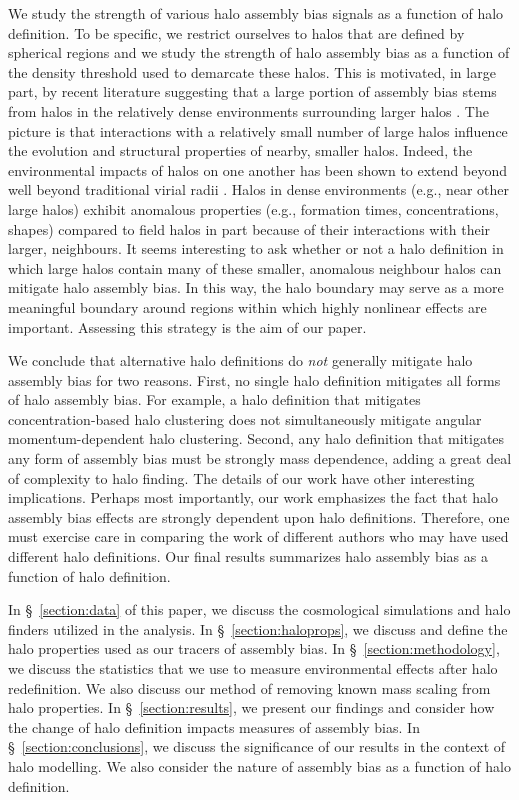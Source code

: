 \documentclass[usenatbib,fleqn]{mnras}
\begin{document}
We study the strength of various halo assembly bias signals as a function of halo definition. To be specific, we restrict ourselves to halos that are defined by spherical regions and we study the strength of halo assembly bias as a function of the density threshold used to demarcate these halos. This is motivated, in large part, by recent literature suggesting that a large portion of assembly bias stems from halos in the relatively dense environments surrounding larger halos \citep{wang_etal07,warnick_etal08,more_etal15,sunayama_etal16}. The picture is that interactions with a relatively small number of large halos influence the evolution and structural properties of nearby, smaller halos. Indeed, the environmental impacts of halos on one another has been shown to extend beyond well beyond traditional 
virial radii \citep{wetzel_etal14,diemer_kravtsov14,behroozi_etal13b,adhikari_etal14,wetzel_nagai15,more_etal15}. Halos in dense environments (e.g., near other large halos) exhibit anomalous properties (e.g., formation times, concentrations, shapes) compared to field halos in part because of their interactions with their larger, neighbours. It seems interesting to ask whether or not a halo definition in which large halos contain many of these smaller, anomalous neighbour halos can mitigate halo assembly bias. In this way, the halo boundary may serve as a more meaningful boundary around regions within which highly nonlinear effects are important. Assessing this strategy is the aim of our paper. 

We conclude that alternative halo definitions do {\em not} generally mitigate halo assembly bias for two reasons. First, no single halo definition mitigates all forms of halo assembly bias. For example, a halo definition that mitigates concentration-based halo clustering does not simultaneously mitigate angular momentum-dependent halo clustering. Second, any halo definition that mitigates any form  of assembly bias must be strongly mass dependence, adding a great deal of complexity to halo finding. The details of our work have other interesting implications. Perhaps most importantly, our work emphasizes the fact that halo assembly bias effects are strongly dependent upon halo definitions. Therefore, one must exercise care in comparing the work of different authors who may have used different halo definitions. Our final results summarizes halo assembly bias as a function of halo definition.
 
In \S~\ref{section:data} of this paper, we discuss the cosmological simulations and halo finders utilized in the analysis. In \S~\ref{section:haloprops}, we discuss and define the halo properties used as our tracers of assembly bias. In \S~\ref{section:methodology}, we discuss the statistics that we use to measure environmental effects after halo redefinition. We also discuss our method of removing known mass scaling from halo properties. In \S~\ref{section:results}, we present our findings and consider how the change of halo definition impacts measures of assembly bias. In \S~\ref{section:conclusions}, we discuss the significance of our results in the context of halo modelling. We also consider the nature of assembly bias as a function of halo definition.
\end{document}
